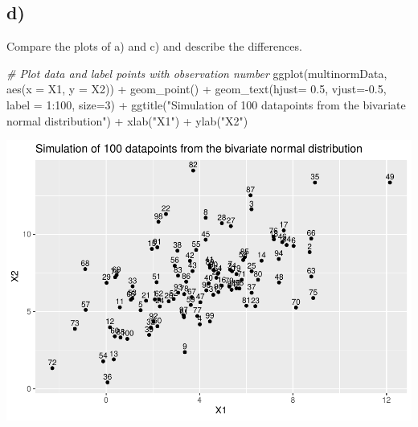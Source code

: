 \documentclass[
]{article}
\newenvironment{Shaded}{\begin{snugshade}}{\end{snugshade}}
\newcommand{\AttributeTok}[1]{\textcolor[rgb]{0.77,0.63,0.00}{#1}}
\newcommand{\CommentTok}[1]{\textcolor[rgb]{0.56,0.35,0.01}{\textit{#1}}}
\newcommand{\DecValTok}[1]{\textcolor[rgb]{0.00,0.00,0.81}{#1}}
\newcommand{\FloatTok}[1]{\textcolor[rgb]{0.00,0.00,0.81}{#1}}
\newcommand{\FunctionTok}[1]{\textcolor[rgb]{0.00,0.00,0.00}{#1}}
\newcommand{\NormalTok}[1]{#1}
\newcommand{\SpecialCharTok}[1]{\textcolor[rgb]{0.00,0.00,0.00}{#1}}
\newcommand{\StringTok}[1]{\textcolor[rgb]{0.31,0.60,0.02}{#1}}
\begin{document}
\hypertarget{d}{%
\subsection{d)}\label{d}}

Compare the plots of a) and c) and describe the differences.\\

\begin{Shaded}
\begin{Highlighting}[]
\CommentTok{\# Plot data and label points with observation number}
\FunctionTok{ggplot}\NormalTok{(multinormData, }\FunctionTok{aes}\NormalTok{(}\AttributeTok{x =}\NormalTok{ X1, }\AttributeTok{y =}\NormalTok{ X2)) }\SpecialCharTok{+} 
  \FunctionTok{geom\_point}\NormalTok{() }\SpecialCharTok{+} \FunctionTok{geom\_text}\NormalTok{(}\AttributeTok{hjust=} \FloatTok{0.5}\NormalTok{, }\AttributeTok{vjust=}\SpecialCharTok{{-}}\FloatTok{0.5}\NormalTok{, }\AttributeTok{label =} \DecValTok{1}\SpecialCharTok{:}\DecValTok{100}\NormalTok{, }\AttributeTok{size=}\DecValTok{3}\NormalTok{) }\SpecialCharTok{+}
  \FunctionTok{ggtitle}\NormalTok{(}\StringTok{"Simulation of 100 datapoints from the bivariate normal distribution"}\NormalTok{) }\SpecialCharTok{+} 
  \FunctionTok{xlab}\NormalTok{(}\StringTok{"X1"}\NormalTok{) }\SpecialCharTok{+} \FunctionTok{ylab}\NormalTok{(}\StringTok{"X2"}\NormalTok{) }
\end{Highlighting}
\end{Shaded}

\includegraphics{assignment2_files/figure-latex/unnamed-chunk-5-1.pdf}
\end{document}
